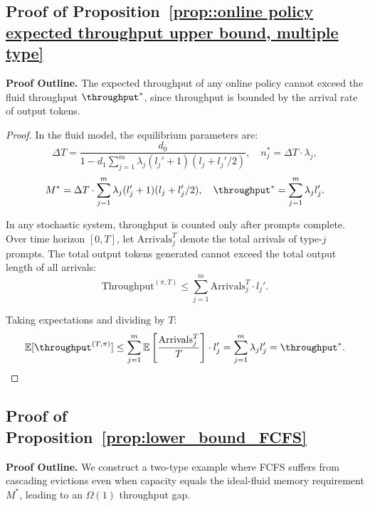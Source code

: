 \subsection{Proof of Proposition~\ref{prop::online policy expected throughput upper bound, multiple type}}
\label{appendix:proof_throughput_upper_bound}

\noindent\textbf{Proof Outline.} The expected throughput of any online policy cannot exceed the fluid throughput $\throughput^*$, since throughput is bounded by the arrival rate of output tokens.

\begin{proof}
In the fluid model, the equilibrium parameters are:
$$\Delta T = \frac{d_0}{1 - d_1\sum_{j=1}^m \lambda_j(l_j'+1)(l_j + l_j'/2)}, \quad n_j^* = \Delta T \cdot \lambda_j,$$
$$M^* = \Delta T \cdot \sum_{j=1}^m \lambda_j(l_j'+1)(l_j + l_j'/2), \quad \throughput^* = \sum_{j=1}^m \lambda_j l_j'.$$

In any stochastic system, throughput is counted only after prompts complete. Over time horizon $[0,T]$, let $\text{Arrivals}_j^T$ denote the total arrivals of type-$j$ prompts. The total output tokens generated cannot exceed the total output length of all arrivals:
$$\text{Throughput}^{(\pi,T)} \leq \sum_{j=1}^m \text{Arrivals}_j^T \cdot l_j'.$$

Taking expectations and dividing by $T$:
$$\mathbb{E}[\throughput^{(T,\pi)}] \leq \sum_{j=1}^m \mathbb{E}\left[\frac{\text{Arrivals}_j^T}{T}\right] \cdot l_j' = \sum_{j=1}^m \lambda_j l_j' = \throughput^*.$$
\end{proof}

\subsection{Proof of Proposition~\ref{prop:lower_bound_FCFS}}
\label{appendix:proof_fcfs_lower_bound}

\noindent\textbf{Proof Outline.} We construct a two-type example where FCFS suffers from cascading evictions even when capacity equals the ideal-fluid memory requirement \(M^*\), leading to an \(\Omega(1)\) throughput gap.

